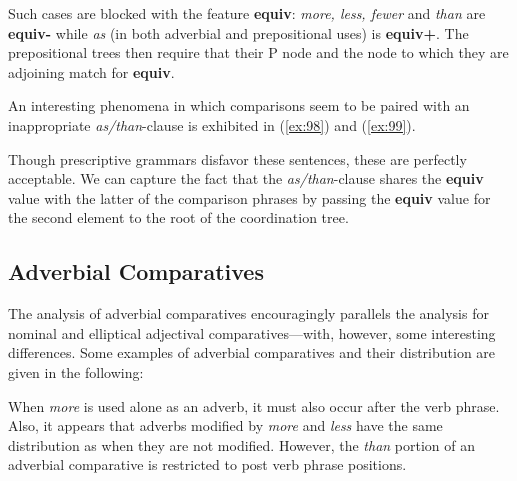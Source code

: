  
\noindent Such cases are blocked with the feature {\bf equiv}:  {\it more, less, fewer} and {\it than} are {\bf equiv-} while {\it as} (in 
both adverbial and prepositional uses) is {\bf equiv+}.  The 
prepositional trees then require that their P node and the node to 
which they are adjoining match for {\bf equiv}. 
 
An interesting phenomena in which comparisons seem to be paired with 
an inappropriate {\it as/than}-clause is exhibited in (\ref{ex:98}) and 
(\ref{ex:99}). 
 
\beginsentences
{}\label{ex:98} 
\label{ex:99} 
\endsentences

 
\noindent Though prescriptive grammars disfavor these sentences, these 
are perfectly acceptable.  We can capture the fact that the {\it as/than}-clause shares the {\bf equiv} value with the latter of the 
comparison phrases by passing the {\bf equiv} value for the second 
element to the root of the coordination tree. 
 
 
\subsection{Adverbial Comparatives} 
 
The analysis of adverbial comparatives encouragingly parallels the 
analysis for nominal and elliptical adjectival comparatives---with, 
however, some interesting differences.  Some examples of adverbial 
comparatives and their distribution are given in the following: 
 
\beginsentences
{}\label{ex:100} 
\label{ex:101} 
\label{ex:102} 
\label{ex:103} 
\label{ex:104} 
\label{ex:105} 
\label{ex:106} 
\label{ex:107} 
\endsentences

 
\noindent When {\it more} is used alone as an adverb, it must also 
occur after the verb phrase. Also, it appears that adverbs modified by 
{\it more} and {\it less} have the same distribution as when they are 
not modified.  However, the {\it than} portion of an adverbial 
comparative is restricted to post verb phrase positions. 
 

